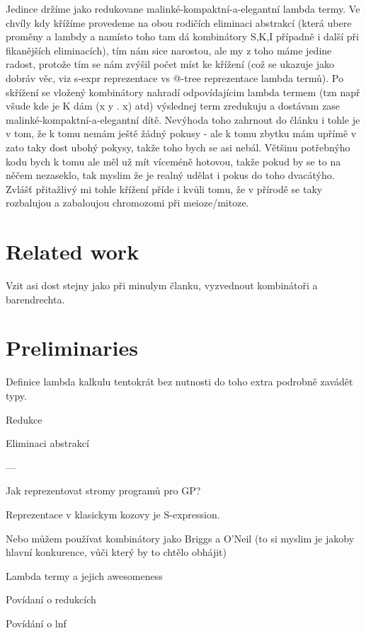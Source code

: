 \documentclass[conference]{IEEEtran}
\begin{document}
Jedince držíme jako redukovane malinké-kompaktní-a-elegantní lambda termy. Ve chvíly kdy křížíme provedeme na obou rodičích eliminaci abstrakcí (která ubere proměny a lambdy a namísto toho tam dá kombinátory S,K,I případně i další při fikanějších eliminacích), tím nám sice narostou, ale my z toho máme jedine radost, protože tím se nám zvýšil počet míst ke křížení (což se ukazuje jako dobráv věc, viz s-expr reprezentace vs @-tree reprezentace lambda termů). Po skřížení se vložený kombinátory nahradí odpovídajícim lambda termem (tzn např všude kde je K dám (x y . x) atd) výslednej term zredukuju a dostávam zase malinké-kompaktní-a-elegantní dítě.
Nevýhoda toho zahrnout do článku i tohle je v tom, že k tomu nemám ještě žádný pokusy - ale k tomu zbytku mám upřímě v zato taky dost ubohý pokysy, takže toho bych se asi nebál. Většinu potřebnýho kodu bych k tomu ale měl už mít víceméně hotovou, takže pokud by se to na něčem nezaseklo, tak myslim že je realný udělat i pokus do toho dvacátýho. Zvlášť přitažlivý mi tohle křížení příde i kvůli tomu, že v přírodě se taky rozbalujou a zabaloujou chromozomi při meioze/mitoze.


\section{Related work}
\label{related}

Vzit asi dost stejny jako při minulym članku, vyzvednout 
kombinátoři a barendrechta.

\section{Preliminaries}
\label{preliminaries}

Definice lambda kalkulu tentokrát bez nutnosti do toho extra podrobně zavádět typy.

Redukce 

Eliminaci abstrakcí

---

Jak reprezentovat stromy programů pro GP?

Reprezentace v klasickym kozovy je S-expression.

Nebo můžem používat kombinátory jako Briggs a O’Neil (to si myslim je jakoby hlavní 
konkurence, vůči který by to chtělo obhájit)

Lambda termy a jejich awesomeness

Povídaní o redukcích

Povídání o lnf
\end{document}
